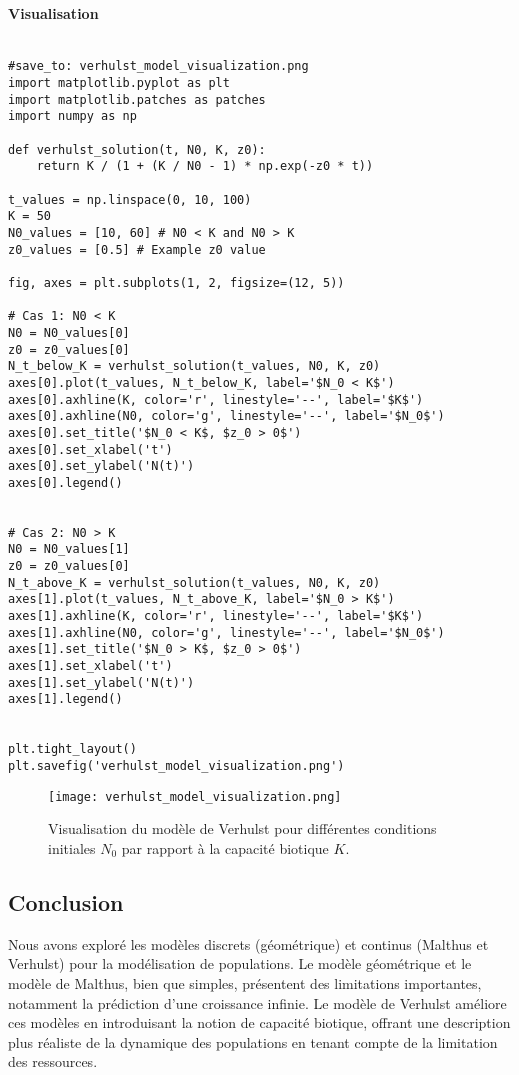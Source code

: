 \documentclass[oneside]{book}
\begin{document}
\subsubsection{Visualisation}

\begin{verbatim}

#save_to: verhulst_model_visualization.png
import matplotlib.pyplot as plt
import matplotlib.patches as patches
import numpy as np

def verhulst_solution(t, N0, K, z0):
    return K / (1 + (K / N0 - 1) * np.exp(-z0 * t))

t_values = np.linspace(0, 10, 100)
K = 50
N0_values = [10, 60] # N0 < K and N0 > K
z0_values = [0.5] # Example z0 value

fig, axes = plt.subplots(1, 2, figsize=(12, 5))

# Cas 1: N0 < K
N0 = N0_values[0]
z0 = z0_values[0]
N_t_below_K = verhulst_solution(t_values, N0, K, z0)
axes[0].plot(t_values, N_t_below_K, label='$N_0 < K$')
axes[0].axhline(K, color='r', linestyle='--', label='$K$')
axes[0].axhline(N0, color='g', linestyle='--', label='$N_0$')
axes[0].set_title('$N_0 < K$, $z_0 > 0$')
axes[0].set_xlabel('t')
axes[0].set_ylabel('N(t)')
axes[0].legend()


# Cas 2: N0 > K
N0 = N0_values[1]
z0 = z0_values[0]
N_t_above_K = verhulst_solution(t_values, N0, K, z0)
axes[1].plot(t_values, N_t_above_K, label='$N_0 > K$')
axes[1].axhline(K, color='r', linestyle='--', label='$K$')
axes[1].axhline(N0, color='g', linestyle='--', label='$N_0$')
axes[1].set_title('$N_0 > K$, $z_0 > 0$')
axes[1].set_xlabel('t')
axes[1].set_ylabel('N(t)')
axes[1].legend()


plt.tight_layout()
plt.savefig('verhulst_model_visualization.png')
\end{verbatim}

\begin{figure}[h]
    \centering
    \texttt{[image: verhulst\_model\_visualization.png]}
    \caption{Visualisation du modèle de Verhulst pour différentes conditions initiales $N_0$ par rapport à la capacité biotique $K$.}
    \label{fig:verhulst_model_visualization}
\end{figure}


\section{Conclusion}

Nous avons exploré les modèles discrets (géométrique) et continus (Malthus et Verhulst) pour la modélisation de populations. Le modèle géométrique et le modèle de Malthus, bien que simples, présentent des limitations importantes, notamment la prédiction d'une croissance infinie. Le modèle de Verhulst améliore ces modèles en introduisant la notion de capacité biotique, offrant une description plus réaliste de la dynamique des populations en tenant compte de la limitation des ressources.\chapter{}
\sloppy
\end{document}
